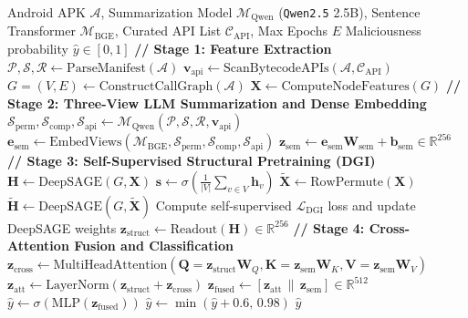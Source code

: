 \documentclass[12pt,a4paper,oneside]{report}
\begin{document}
\begin{algorithm}[htbp]
\caption{AppPoet Multimodal Pretraining and Inference Pipeline}\label{alg:apppoet}
\begin{algorithmic}[1]
\Require Android APK $\mathcal{A}$, Summarization Model $\mathcal{M}_{\text{Qwen}}$ (\texttt{Qwen2.5} 2.5B), Sentence Transformer $\mathcal{M}_{\text{BGE}}$, Curated API List $\mathcal{C}_{\text{API}}$, Max Epochs $E$
\Ensure Maliciousness probability $\hat{y} \in [0, 1]$
\State \textbf{// Stage 1: Feature Extraction}
\State $\mathcal{P}, \mathcal{S}, \mathcal{R} \gets \text{ParseManifest}(\mathcal{A})$ 
\State $\mathbf{v}_{\text{api}} \gets \text{ScanBytecodeAPIs}(\mathcal{A}, \mathcal{C}_{\text{API}})$ 
\State $G = (V, E) \gets \text{ConstructCallGraph}(\mathcal{A})$ 
\State $\mathbf{X} \gets \text{ComputeNodeFeatures}(G)$ 
\State \textbf{// Stage 2: Three-View LLM Summarization and Dense Embedding}
\State $\mathcal{S}_{\text{perm}}, \mathcal{S}_{\text{comp}}, \mathcal{S}_{\text{api}} \gets \mathcal{M}_{\text{Qwen}}(\mathcal{P}, \mathcal{S}, \mathcal{R}, \mathbf{v}_{\text{api}})$ 
\State $\mathbf{e}_{\text{sem}} \gets \text{EmbedViews}(\mathcal{M}_{\text{BGE}}, \mathcal{S}_{\text{perm}}, \mathcal{S}_{\text{comp}}, \mathcal{S}_{\text{api}})$ 
\State $\mathbf{z}_{\text{sem}} \gets \mathbf{e}_{\text{sem}} \mathbf{W}_{\text{sem}} + \mathbf{b}_{\text{sem}} \in \mathbb{R}^{256}$
\State \textbf{// Stage 3: Self-Supervised Structural Pretraining (DGI)}
    \State $\mathbf{H} \gets \text{DeepSAGE}(G, \mathbf{X})$ 
    \State $\mathbf{s} \gets \sigma\left(\frac{1}{|V|} \sum_{v \in V} \mathbf{h}_v\right)$ 
    \State $\widetilde{\mathbf{X}} \gets \text{RowPermute}(\mathbf{X})$ 
    \State $\widetilde{\mathbf{H}} \gets \text{DeepSAGE}(G, \widetilde{\mathbf{X}})$ 
    \State Compute self-supervised $\mathcal{L}_{\text{DGI}}$ loss and update DeepSAGE weights
\EndFor
\State $\mathbf{z}_{\text{struct}} \gets \text{Readout}(\mathbf{H}) \in \mathbb{R}^{256}$
\State \textbf{// Stage 4: Cross-Attention Fusion and Classification}
\State $\mathbf{z}_{\text{cross}} \gets \text{MultiHeadAttention}(\mathbf{Q} = \mathbf{z}_{\text{struct}} \mathbf{W}_Q, \mathbf{K} = \mathbf{z}_{\text{sem}} \mathbf{W}_K, \mathbf{V} = \mathbf{z}_{\text{sem}} \mathbf{W}_V)$
\State $\mathbf{z}_{\text{att}} \gets \text{LayerNorm}(\mathbf{z}_{\text{struct}} + \mathbf{z}_{\text{cross}})$
\State $\mathbf{z}_{\text{fused}} \gets [\mathbf{z}_{\text{att}} \,\|\, \mathbf{z}_{\text{sem}}] \in \mathbb{R}^{512}$
\State $\hat{y} \gets \sigma(\text{MLP}(\mathbf{z}_{\text{fused}}))$
    \State $\hat{y} \gets \min(\hat{y} + 0.6, \, 0.98)$ 
\EndIf
\State \Return $\hat{y}$
\end{algorithmic}
\end{algorithm}
\end{document}
